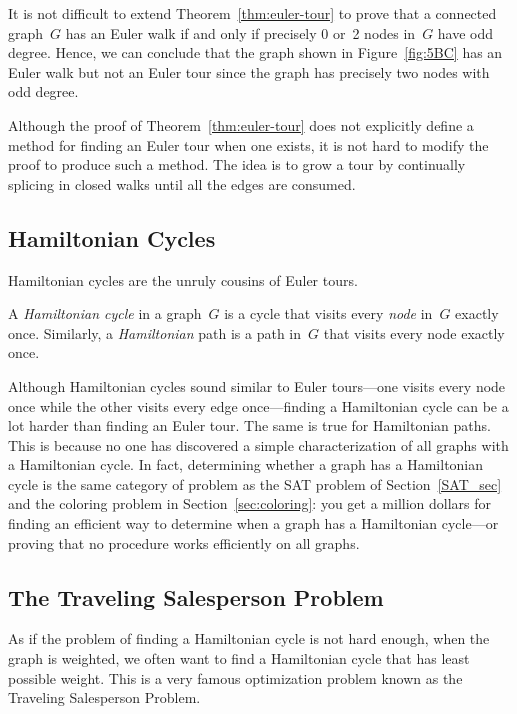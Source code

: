 It is not difficult to extend Theorem~\ref{thm:euler-tour} to prove that a
connected graph~$G$ has an Euler walk if and only if precisely 0 or~2
nodes in~$G$ have odd degree.  Hence, we can conclude that the graph
shown in Figure~\ref{fig:5BC} has an Euler walk but not an Euler tour
since the graph has precisely two nodes with odd degree.

Although the proof of Theorem~\ref{thm:euler-tour} does not explicitly
define a method for finding an Euler tour when one exists, it is not
hard to modify the proof to produce such a method.  The idea is to
grow a tour by continually splicing in closed walks until all the
edges are consumed.

\subsection{Hamiltonian Cycles}

Hamiltonian cycles are the unruly cousins of Euler tours.

\begin{definition}\label{def:hamiltonian-cycle}
A \emph{Hamiltonian cycle} in a graph~$G$ is a cycle that visits every
\emph{node} in~$G$ exactly once.  Similarly, a \emph{Hamiltonian} path
is a path in~$G$ that visits every node exactly once.
\end{definition}

Although Hamiltonian cycles sound similar to Euler tours---one visits
every node once while the other visits every edge once---finding a
Hamiltonian cycle can be a lot harder than finding an Euler tour.  The
same is true for Hamiltonian paths.  This is because no one has
discovered a simple characterization of all graphs with a Hamiltonian
cycle.  In fact, determining whether a graph has a Hamiltonian cycle
is the same category of problem as the SAT problem of
Section~\ref{SAT_sec} and the coloring problem in
Section~\ref{sec:coloring}: you get a million dollars for finding an
efficient way to determine when a graph has a Hamiltonian cycle---or
proving that no procedure works efficiently on all graphs.

\subsection{The Traveling Salesperson Problem}

As if the problem of finding a Hamiltonian cycle is not hard enough,
when the graph is weighted, we often want to find a Hamiltonian cycle
that has least possible weight.  This is a very famous optimization
problem known as the Traveling Salesperson Problem.

